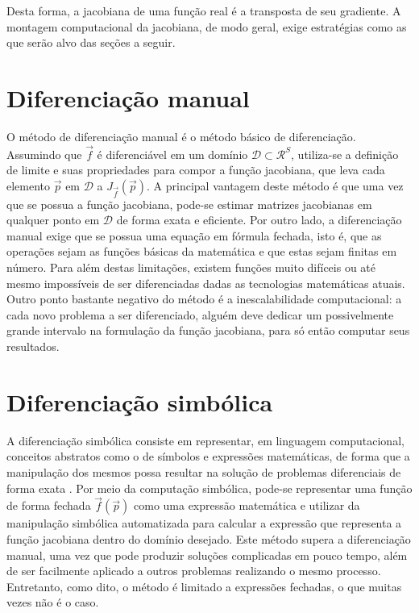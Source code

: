   Desta forma, a jacobiana de uma função real é a transposta de seu gradiente. A montagem computacional da jacobiana, de modo geral, exige estratégias como as que serão alvo das seções a seguir.

  \section{Diferenciação manual}

    O método de diferenciação manual é o método básico de diferenciação. Assumindo que $\vec{f}$ é diferenciável em um domínio $\mathcal{D} \subset \mathcal{R}^S$, utiliza-se a definição de limite e suas propriedades para compor a função jacobiana, que leva cada elemento $\vec{p}$ em $\mathcal{D}$ a $J_{\vec{f}}(\vec{p})$. A principal vantagem deste método é que uma vez que se possua a função jacobiana, pode-se estimar matrizes jacobianas em qualquer ponto em $\mathcal{D}$ de forma exata e eficiente. Por outro lado, a diferenciação manual exige que se possua uma equação em fórmula fechada, isto é, que as operações sejam as funções básicas da matemática e que estas sejam finitas em número. Para além destas limitações, existem funções muito difíceis ou até mesmo impossíveis de ser diferenciadas dadas as tecnologias matemáticas atuais. Outro ponto bastante negativo do método é a inescalabilidade computacional: a cada novo problema a ser diferenciado, alguém deve dedicar um possivelmente grande intervalo na formulação da função jacobiana, para só então computar seus resultados.

  \section{Diferenciação simbólica}

    A diferenciação simbólica consiste em representar, em linguagem computacional, conceitos abstratos como o de símbolos e expressões matemáticas, de forma que a manipulação dos mesmos possa resultar na solução de problemas diferenciais de forma exata . Por meio da computação simbólica, pode-se representar uma função de forma fechada $\vec{f}(\vec{p})$ como uma expressão matemática e utilizar da manipulação simbólica automatizada para calcular a expressão que representa a função jacobiana dentro do domínio desejado. Este método supera a diferenciação manual, uma vez que pode produzir soluções complicadas em pouco tempo, além de ser facilmente aplicado a outros problemas realizando o mesmo processo. Entretanto, como dito, o método é limitado a expressões fechadas, o que muitas vezes não é o caso.

